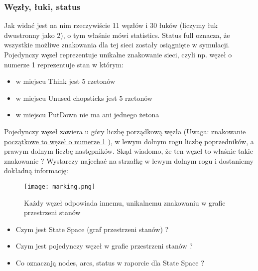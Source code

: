 \documentclass[a4paper,15pt]{article}
\begin{document}
\subsubsection{Węzły, łuki, status}
Jak widać jest na nim rzeczywiście 11 węzłów i 30 łuków (liczymy łuk dwustronny jako 2), o tym właśnie mówi statistics. Status full oznacza, że wszystkie możliwe znakowania dla tej sieci zostały osiągnięte w symulacji. \\
Pojedynczy węzeł reprezentuje unikalne znakowanie sieci, czyli np. węzeł o numerze 1 reprezentuje stan w którym:
\begin{itemize}
\item w miejscu Think jest 5 rzetonów
\item w miejscu Unused chopsticks jest 5 rzetonów
\item w miejscu PutDown nie ma ani jednego żetona
\end{itemize}
Pojedynczy węzeł zawiera u góry liczbę porządkową węzła (\underline{Uwaga: znakowanie początkowe to węzeł o numerze 1} ), w lewym dolnym rogu liczbę poprzedników, a prawym dolnym liczbę następników. 
Skąd wiadomo, że ten węzeł to właśnie takie znakowanie ? Wystarczy najechać na strzałkę w lewym dolnym rogu i dostaniemy dokładną informację:
\begin{figure}[H]
\centerline{\texttt{[image: marking.png]}}
\caption{Każdy węzeł odpowiada innemu, unikalnemu znakowaniu w grafie przestrzeni stanów}
\label{fig:marking}
\end{figure}

\begin{framed}
\begin{itemize}
\item Czym jest State Space (graf przestrzeni stanów) ?
\item Czym jest pojedynczy węzeł w grafie przestrzeni stanów ?
\item Co oznaczają nodes, arcs, status w raporcie dla State Space ?
\end{itemize}
\end{framed}
\end{document}
